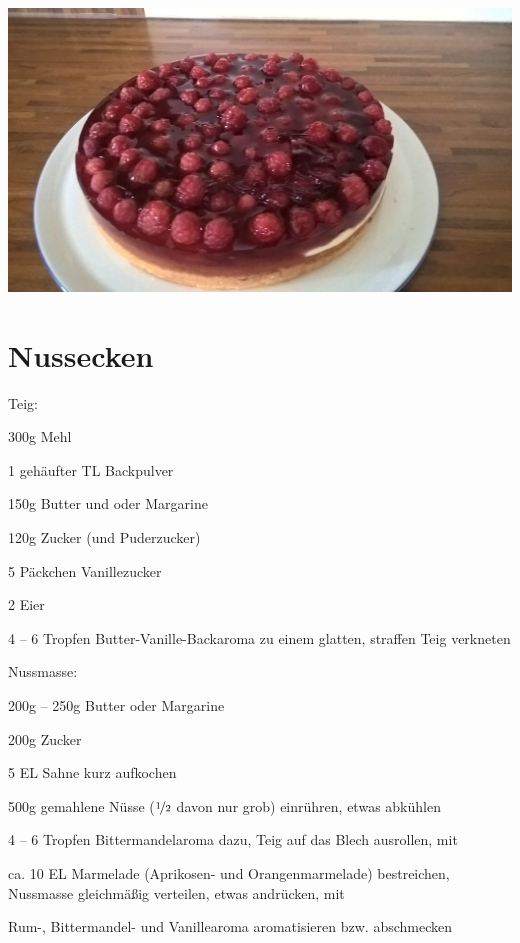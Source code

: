 \documentclass[a4,12pt,footinclude=true,oneside,headinclude=true]{scrartcl} %
\author[myemail@cookby.com]{Jokobus}
\begin{document}
	\begin{titlepage}
		\maketitle
		\includegraphics[width=\textwidth]{cake.jpg}
		\thispagestyle{empty}
	\end{titlepage}
	
	{\setcounter{page}{2}
		\normalfont
		\tableofcontents
		\pagebreak
	}
	
\section{Nussecken}



Teig: 
\begin{ingredients}
	\item 300g Mehl
	\item 1 gehäufter TL Backpulver 
	\item 150g Butter und oder Margarine
	\item 120g Zucker (und Puderzucker)
	\item 5 Päckchen Vanillezucker
	\item 2 Eier 
	\item 4 -- 6 Tropfen Butter-Vanille-Backaroma
	\subitem zu einem glatten, straffen Teig verkneten
\end{ingredients}
	Nussmasse: 

\begin{ingredients}
	\item 200g -- 250g Butter oder Margarine
	\item 200g Zucker
	\item 5 EL Sahne 
		\subitem kurz aufkochen
	\item 500g gemahlene Nüsse ($\nicefrac{1}{2}$ davon nur grob)
		\subitem einrühren, etwas abkühlen
	\item 4 -- 6 Tropfen Bittermandelaroma
		\subitem dazu, Teig auf das Blech ausrollen, mit
	\item ca. 10 EL Marmelade (Aprikosen- und Orangenmarmelade)
		\subitem bestreichen, Nussmasse gleichmäßig verteilen, etwas andrücken, mit
	\item Rum-, Bittermandel- und Vanillearoma
		\subitem aromatisieren bzw. abschmecken
\end{ingredients} 
\end{document}
